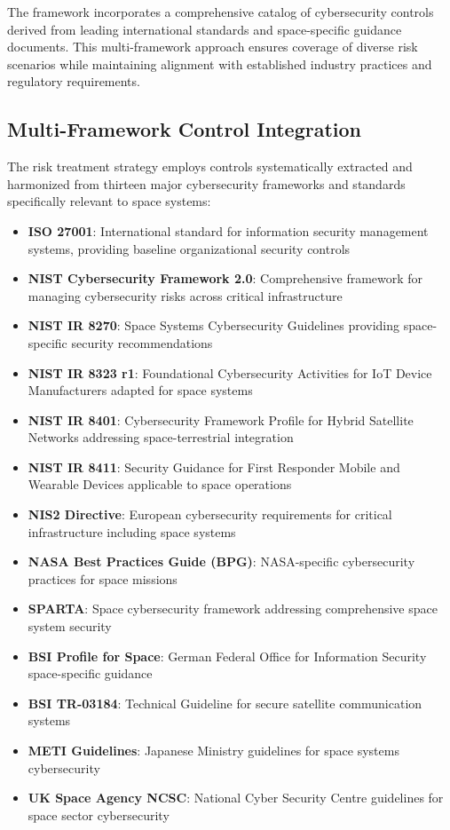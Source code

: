 \documentclass[binding=0.6cm]{sapthesis}
\begin{document}
The framework incorporates a comprehensive catalog of cybersecurity controls derived from leading international standards and space-specific guidance documents. This multi-framework approach ensures coverage of diverse risk scenarios while maintaining alignment with established industry practices and regulatory requirements.

\subsection{Multi-Framework Control Integration}

The risk treatment strategy employs controls systematically extracted and harmonized from thirteen major cybersecurity frameworks and standards specifically relevant to space systems:

\begin{itemize}
    \item \textbf{ISO 27001}: International standard for information security management systems, providing baseline organizational security controls
    \item \textbf{NIST Cybersecurity Framework 2.0}: Comprehensive framework for managing cybersecurity risks across critical infrastructure
    \item \textbf{NIST IR 8270}: Space Systems Cybersecurity Guidelines providing space-specific security recommendations
    \item \textbf{NIST IR 8323 r1}: Foundational Cybersecurity Activities for IoT Device Manufacturers adapted for space systems
    \item \textbf{NIST IR 8401}: Cybersecurity Framework Profile for Hybrid Satellite Networks addressing space-terrestrial integration
    \item \textbf{NIST IR 8411}: Security Guidance for First Responder Mobile and Wearable Devices applicable to space operations
    \item \textbf{NIS2 Directive}: European cybersecurity requirements for critical infrastructure including space systems
    \item \textbf{NASA Best Practices Guide (BPG)}: NASA-specific cybersecurity practices for space missions
    \item \textbf{SPARTA}: Space cybersecurity framework addressing comprehensive space system security
    \item \textbf{BSI Profile for Space}: German Federal Office for Information Security space-specific guidance
    \item \textbf{BSI TR-03184}: Technical Guideline for secure satellite communication systems
    \item \textbf{METI Guidelines}: Japanese Ministry guidelines for space systems cybersecurity
    \item \textbf{UK Space Agency NCSC}: National Cyber Security Centre guidelines for space sector cybersecurity
\end{itemize}
\end{document}
